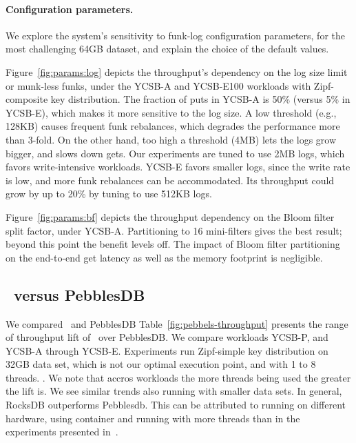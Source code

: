 \paragraph{Configuration parameters.} 
We explore the system's  sensitivity to funk-log configuration parameters, for the most challenging 64GB dataset, 
and explain the choice of the default values.

Figure~\ref{fig:params:log} depicts the throughput's dependency on the log size limit or munk-less funks, 
under the YCSB-A and YCSB-E100 workloads with Zipf-composite key distribution. 
The fraction of puts in YCSB-A is 50\% (versus 5\% in YCSB-E), which makes it more sensitive to the log size. 
A low threshold (e.g., 128KB) causes frequent funk rebalances, which degrades the performance more than 3-fold. 
On the other hand, too high a threshold (4MB) lets the logs grow bigger, and slows down gets. Our experiments are 
tuned to use 2MB logs, which favors write-intensive workloads. YCSB-E favors smaller logs, since the write 
rate is low, and more funk rebalances can be accommodated. Its throughput could grow by up to 20\% by tuning to
use 512KB logs.

Figure~\ref{fig:params:bf} depicts the throughput dependency on the Bloom filter split factor, under YCSB-A. 
Partitioning to 16 mini-filters gives the best result; beyond this point the benefit levels off. 
The impact of Bloom filter partitioning on the end-to-end get latency as well as the memory footprint is negligible.

\subsection{\sys\ versus PebblesDB}
\label{ssec:pebbles} 

We compared \sys\ and PebblesDB 
Table~\ref{fig:pebbels-throughput} presents the range of throughput lift of \sys\ over PebblesDB. 
We compare workloads YCSB-P, and YCSB-A through YCSB-E. Experiments run Zipf-simple key distribution on 32GB data set, which is not our optimal execution point, and with 1 to 8 threads.
 .
We note that accros workloads the more threads being used the greater the lift is. We see similar trends also running with smaller data sets.
In general, RocksDB outperforms Pebblesdb. This can be attributed to running on different hardware, using container and running with more threads than in the experiments presented in~\cite{PebblesDB}.


